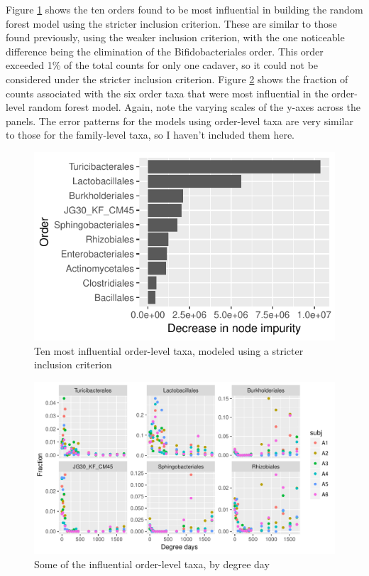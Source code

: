 \documentclass{article}
\begin{document}
Figure \ref{fig:infl_order_taxa_stric_crit} shows the ten orders found
to be most influential in building the random forest model using the
stricter inclusion criterion.  These are similar to those found
previously, using the weaker inclusion criterion, with the one
noticeable difference being the elimination of the Bifidobacteriales
order.  This order exceeded 1\% of the total counts for only one
cadaver, so it could not be considered under the stricter inclusion
criterion.  Figure \ref{fig:scatter_order_taxa} shows the fraction of
counts associated with the six order taxa that were most influential
in the order-level random forest model.  Again, note the varying
scales of the y-axes across the panels.  The error patterns for the
models using order-level taxa are very similar to those for the
family-level taxa, so I haven't included them here.

\begin{figure}
  \centering
  \includegraphics{../../only_orders/all_time_steps/hit_1perc_twice/orig_units_all_data_orders_barchart}
  \caption{Ten most influential order-level taxa, modeled using a stricter inclusion criterion}
  \label{fig:infl_order_taxa_stric_crit}
\end{figure}


\begin{figure}
  \centering
  \includegraphics{../../only_orders/all_time_steps/influential_order_taxa_panel}
  \caption{Some of the influential order-level taxa, by degree day}
  \label{fig:scatter_order_taxa}
\end{figure}
\end{document}
